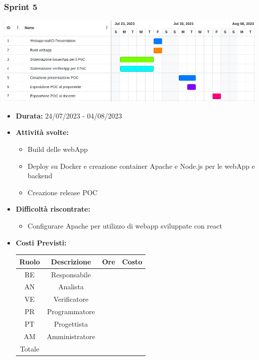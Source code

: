     \subsubsection{Sprint 5}
\begin{center}
    \includegraphics[scale = 0.5]{./res/img/Sprint 5.png}
  \end{center}
\begin{itemize}
    \item \textbf{Durata:} 24/07/2023 - 04/08/2023 
    \item \textbf{Attività svolte:}
    \begin{itemize}
        \item Build delle webApp
        \item Deploy su Docker e creazione container Apache e Node.js per le webApp e backend
        \item Creazione release POC 
    \end{itemize}
    \item \textbf{Difficoltà riscontrate:}
    \begin{itemize}
        \item Configurare Apache per utilizzo di webapp sviluppate con react
    \end{itemize}
    \item \textbf{Costi Previsti:}
    \begin{longtable}{|c|c|c|c|}
        \hline
        Ruolo & Descrizione & Ore & Costo \\
        \hline
        RE & Responsabile &  &  \\
        \hline
        AN & Analista &  &  \\
        \hline
        VE & Verificatore &  &  \\
        \hline
        PR & Programmatore &  &  \\
        \hline
        PT & Progettista &  &  \\
        \hline
        AM & Amministratore &  &  \\
        \hline
        Totale & &  &  \\

\end{longtable}
\end{itemize}
